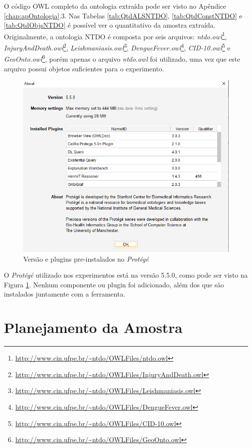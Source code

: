 \documentclass{bcc}
\begin{document}
O código OWL completo da ontologia extraída pode ser visto no Apêndice \ref{chap:apOntologia}.3. Nas Tabelas \ref{tab:QtdALSNTDO}, \ref{tab:QtdConstNTDO} e \ref{tab:QtdObjsNTDO} é possível ver o quantitativo da amostra extraída. Originalmente, a ontologia NTDO é composta por seis arquivos: \textit{ntdo.owl}\footnote{\url{http://www.cin.ufpe.br/~ntdo/OWLFiles/ntdo.owl}}, \textit{InjuryAndDeath.owl}\footnote{\url{http://www.cin.ufpe.br/~ntdo/OWLFiles/InjuryAndDeath.owl}}, \textit{Leishmaniasis.owl}\footnote{\url{http://www.cin.ufpe.br/~ntdo/OWLFiles/Leishmaniasis.owl}}, \textit{DengueFever.owl}\footnote{\url{http://www.cin.ufpe.br/~ntdo/OWLFiles/DengueFever.owl}}, \textit{CID-10.owl}\footnote{\url{http://www.cin.ufpe.br/~ntdo/OWLFiles/CID-10.owl}} e \textit{GeoOnto.owl}\footnote{\url{http://www.cin.ufpe.br/~ntdo/OWLFiles/GeoOnto.owl}}, porém apenas o arquivo \textit{ntdo.owl} foi utilizado, uma vez que este arquivo possui objetos suficientes para o experimento.

\begin{figure}[H]
\centering
\includegraphics[width=.5\textwidth]{Figuras/protege.png}
\caption{Versão e plugins pre-instalados no \textit{Protégé} } 
\label{fig:protege}
\end{figure}

O \textit{Protégé} utilizado nos experimentos está na versão 5.5.0, como pode ser visto na Figura \ref{fig:protege}. Nenhum componente ou plugin foi adicionado, além dos que são instalados juntamente com a ferramenta.

\section{Planejamento da Amostra}
\end{document}
